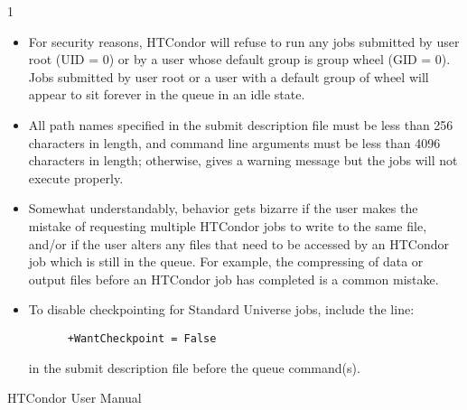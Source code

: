 \begin{ManPage}{\label{man-condor-submit}}{1}
\begin{itemize}
\item For security reasons, HTCondor will refuse to run any jobs submitted
by user root (UID = 0) or by a user whose default group is group wheel
(GID = 0). Jobs submitted by user root or a user with a default group of
wheel will appear to sit forever in the queue in an idle state. 

\item All path names specified in the submit description file must be
less than 256 characters in length, and command line arguments must be
less than 4096 characters in length; otherwise,  gives a
warning message but the jobs will not execute properly. 

\item Somewhat understandably, behavior gets bizarre if the user makes
the mistake of requesting multiple HTCondor jobs to write to the
same file, and/or if the user alters any files that need to be accessed
by an HTCondor job which is still in the queue.
For example, the compressing of data or
output files before an HTCondor job has completed is a common mistake.

\item To disable checkpointing for Standard Universe jobs, include the
line:
\begin{verbatim}
      +WantCheckpoint = False
\end{verbatim}
in the submit description file before the queue command(s).
\end{itemize}

\SeeAlso
HTCondor User Manual

\end{ManPage}

